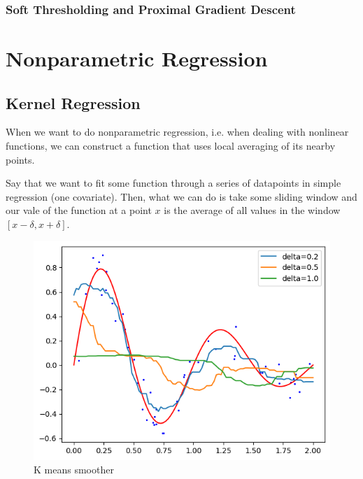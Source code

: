 \documentclass{article}
\begin{document}
    \subsubsection{Soft Thresholding and Proximal Gradient Descent} 



\section{Nonparametric Regression}

  \subsection{Kernel Regression}

    When we want to do nonparametric regression, i.e. when dealing with nonlinear functions, we can construct a function that uses local averaging of its nearby points. 

    \begin{example}
      Say that we want to fit some function through a series of datapoints in simple regression (one covariate). Then, what we can do is take some sliding window and our vale of the function at a point $x$ is the average of all values in the window $[x - \delta, x + \delta]$. 
      \begin{figure}[H]
        \centering 
        \includegraphics[scale=0.6]{img/kmeans_smoother.png}
        \caption{K means smoother} 
        \label{fig:kmeans_smoother}
      \end{figure}
    \end{example}
\end{document}
